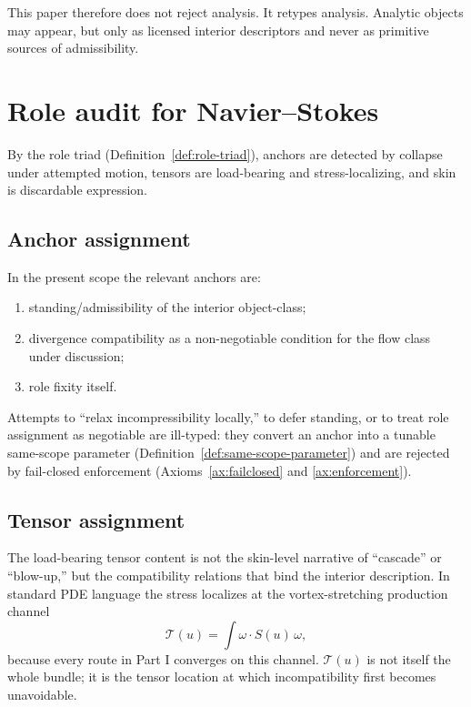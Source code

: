 \begin{remark}
This paper therefore does not reject analysis. It retypes analysis. Analytic objects may appear,
but only as licensed interior descriptors and never as primitive sources of admissibility.
\end{remark}

\section{Role audit for Navier--Stokes}
By the role triad (Definition~\ref{def:role-triad}), anchors are detected by collapse under attempted motion,
tensors are load-bearing and stress-localizing, and skin is discardable expression.


\subsection{Anchor assignment}
In the present scope the relevant anchors are:
\begin{enumerate}[label=(A\arabic*), leftmargin=2.2em]
\item standing/admissibility of the interior object-class;
\item divergence compatibility as a non-negotiable condition for the flow class under discussion;
\item role fixity itself.
\end{enumerate}
Attempts to ``relax incompressibility locally,'' to defer standing, or to treat role assignment as
negotiable are ill-typed: they convert an anchor into a tunable same-scope parameter
(Definition~\ref{def:same-scope-parameter}) and are rejected by fail-closed enforcement
(Axioms~\ref{ax:failclosed} and \ref{ax:enforcement}).


\subsection{Tensor assignment}
The load-bearing tensor content is not the skin-level narrative of ``cascade'' or ``blow-up,'' but the
compatibility relations that bind the interior description. In standard PDE language the stress
localizes at the vortex-stretching production channel
\[
\mathcal T(u)=\int \omega\cdot S(u)\,\omega,
\]
because every route in Part I converges on this channel. $\mathcal T(u)$ is not
itself the whole bundle; it is the tensor location at which incompatibility first becomes unavoidable.

